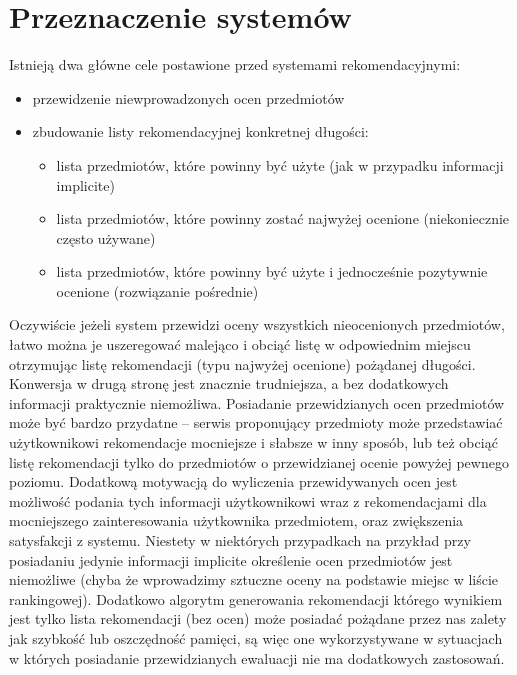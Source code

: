 \documentclass{pracamgr}
\begin{document}
  \section{Przeznaczenie systemów}
   Istnieją dwa główne cele postawione przed systemami rekomendacyjnymi:
   \begin{itemize}\itemsep1pt \parskip0pt 
    \item przewidzenie niewprowadzonych ocen przedmiotów   
    \item zbudowanie listy rekomendacyjnej konkretnej długości:
      \begin{itemize}\itemsep1pt \parskip0pt 
	\item lista przedmiotów, które powinny być użyte (jak w przypadku informacji implicite)
	\item lista przedmiotów, które powinny zostać najwyżej ocenione (niekoniecznie często używane)
	\item lista przedmiotów, które powinny być użyte i jednocześnie pozytywnie ocenione (rozwiązanie pośrednie)
      \end{itemize}
   \end{itemize}
   Oczywiście jeżeli system przewidzi oceny wszystkich nieocenionych przedmiotów,
   łatwo można je uszeregować malejąco i obciąć listę w odpowiednim miejscu otrzymując listę rekomendacji (typu najwyżej ocenione) pożądanej długości.\newline
   Konwersja w drugą stronę jest znacznie trudniejsza, a bez dodatkowych informacji praktycznie niemożliwa.\newline
   Posiadanie przewidzianych ocen przedmiotów może być bardzo przydatne -- serwis proponujący przedmioty może przedstawiać użytkownikowi
   rekomendacje mocniejsze i słabsze w inny sposób, lub też obciąć listę rekomendacji tylko do przedmiotów o przewidzianej ocenie powyżej pewnego poziomu.
   Dodatkową motywacją do wyliczenia przewidywanych ocen jest możliwość podania tych informacji użytkownikowi wraz z rekomendacjami
   dla mocniejszego zainteresowania użytkownika przedmiotem, oraz zwiększenia satysfakcji z systemu.\newline
   Niestety w niektórych przypadkach na przykład przy posiadaniu jedynie informacji implicite określenie ocen przedmiotów jest niemożliwe
   (chyba że wprowadzimy sztuczne oceny na podstawie miejsc w liście rankingowej). Dodatkowo algorytm generowania rekomendacji którego wynikiem
   jest tylko lista rekomendacji (bez ocen) może posiadać pożądane przez nas zalety jak szybkość lub oszczędność pamięci,
   są więc one wykorzystywane w sytuacjach w których posiadanie przewidzianych ewaluacji nie ma dodatkowych zastosowań.
   
\end{document}
